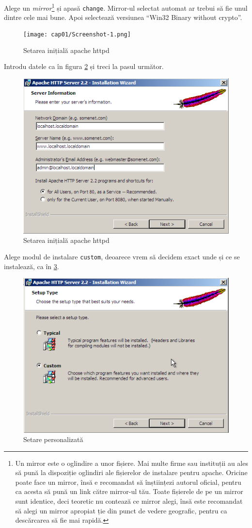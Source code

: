 Alege un \textsl{mirror}\footnote{
Un mirror este o oglindire a unor fișiere. Mai multe firme sau instituții au ales
să pună la dispoziție oglindiri ale fișierelor de instalare pentru apache. Oricine
poate face un mirror, însă e recomandat să înștiințezi autorul oficial, pentru
ca acesta să pună un link către mirror-ul tău. Toate fișierele de pe un mirror sunt identice,
deci teoretic nu contează ce mirror alegi, însă este recomandat să alegi un mirror
apropiat ție din punct de vedere geografic, pentru ca descărcarea să fie mai
rapidă.} și apasă \texttt{change}. Mirror-ul selectat automat ar trebui să fie unul
dintre cele mai bune. Apoi selectează versiunea ``Win32 Binary without crypto''.

\begin{figure}[ht!]
  \centering
    \texttt{[image: cap01/Screenshot-1.png]}
  \caption{Setarea inițială apache httpd}
  \label{fig:httpd setup}
\end{figure}

Introdu datele ca în figura \ref{fig:httpd setup} și treci la pasul următor.

\begin{figure}[ht!]
 \centering
   \includegraphics[width=300bp]{cap01/Screenshot-2.png}
 \caption{Setarea inițială apache httpd}
 \label{fig:httpd setup}
\end{figure}

Alege modul de instalare \texttt{custom}, deoarece vrem să decidem exact unde și ce
se instalează, ca în \ref{fig:httpd check custom setup}.

\begin{figure}[ht!]
 \centering
   \includegraphics[width=250bp]{cap01/Screenshot-3.png}
 \caption{Setare personalizată}
 \label{fig:httpd check custom setup}
\end{figure}

